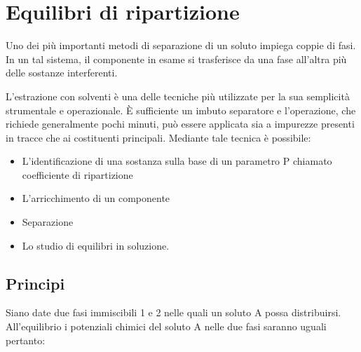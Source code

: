 \chapter{Equilibri di ripartizione}

Uno dei più importanti metodi di separazione di un soluto impiega coppie di fasi. In un tal sistema, il componente in esame si trasferisce da una fase all'altra più delle sostanze interferenti.

L'estrazione con solventi è una delle tecniche più utilizzate per la sua semplicità strumentale e operazionale. È sufficiente un imbuto separatore e l'operazione, che richiede generalmente pochi minuti, può essere applicata sia a impurezze presenti in tracce che ai costituenti principali. Mediante tale tecnica è possibile:
\begin{itemize}
\item L'identificazione di una sostanza sulla base di un parametro P chiamato coefficiente di ripartizione
\item L'arricchimento di un componente
\item Separazione
\item Lo studio di equilibri in soluzione.
\end{itemize}

\section{Principi}
Siano date due fasi immiscibili 1 e 2 nelle quali un soluto A possa distribuirsi. All'equilibrio i potenziali chimici del soluto A nelle due fasi saranno uguali pertanto:


